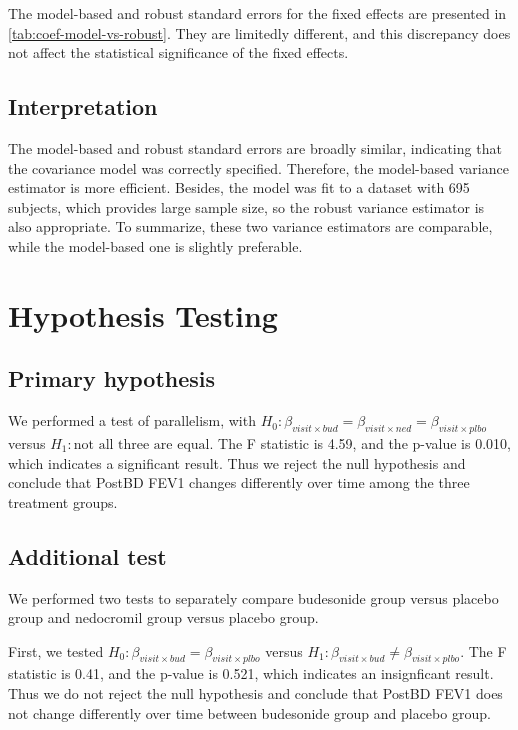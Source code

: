 \documentclass[12pt]{article}
\begin{document}
The model-based and robust standard errors for
the fixed effects are presented in \cref{tab:coef-model-vs-robust}.
They are limitedly different, and this discrepancy does
not affect the statistical significance of the
fixed effects.


\subsection{Interpretation}

The model-based and robust standard errors
are broadly similar, indicating that the covariance model
was correctly specified.
Therefore, the model-based variance estimator
is more efficient.
Besides, the model was fit to a dataset with 695 subjects,
which provides large sample size,
so the robust variance estimator is also appropriate.
To summarize, these two variance estimators are comparable,
while the model-based one is slightly preferable.

\section{Hypothesis Testing}

\subsection{Primary hypothesis}

We performed a test of parallelism, with
$H_0: \beta_{visit \times bud} = \beta_{visit \times ned} = \beta_{visit \times plbo}$
versus $H_1: \text{not all three are equal}$.
The F statistic is 4.59, and the p-value is 0.010, which indicates
a significant result. Thus we reject the null hypothesis
and conclude that PostBD FEV1 changes differently over time
among the three treatment groups.

\subsection{Additional test}
We performed two tests to separately compare budesonide group versus
placebo group and nedocromil group versus placebo group.

First, we tested $H_0: \beta_{visit \times bud} = \beta_{visit \times plbo}$
versus $H_1: \beta_{visit \times bud} \neq \beta_{visit \times plbo}$.
The F statistic is 0.41, and the p-value is 0.521, which
indicates an insignficant result. Thus we do not reject the null
hypothesis and conclude that PostBD FEV1 does not
change differently over time between budesonide group and placebo
group.
\end{document}

